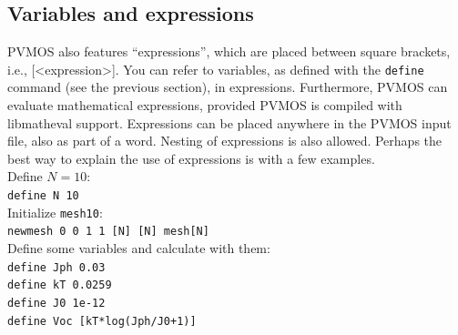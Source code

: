 \documentclass[noshowpacs,preprintnumbers,amsmath,amssymb, letter]{revtex4}
\begin{document}
\subsection{\label{expressions}Variables and expressions}
PVMOS also features ``expressions'', which are placed between square brackets, i.e., [\textless expression\textgreater]. You can refer to variables, as defined with the \texttt{define} command (see the previous section), in expressions. Furthermore, PVMOS can evaluate mathematical expressions, provided PVMOS is compiled with libmatheval support. Expressions can be placed anywhere in the PVMOS input file, also as part of a word. Nesting of expressions is also allowed. Perhaps the best way to explain the use of expressions is with a few examples.\\
Define $N=10$:\\
\texttt{define N 10} \\
Initialize \texttt{mesh10}:\\
\texttt{newmesh 0 0 1 1 [N] [N] mesh[N]}\\
Define some variables and calculate with them:\\
\texttt{define Jph 0.03} \\
\texttt{define kT 0.0259} \\
\texttt{define J0 1e-12} \\
\texttt{define Voc [kT*log(Jph/J0+1)]} \\
\end{document}
